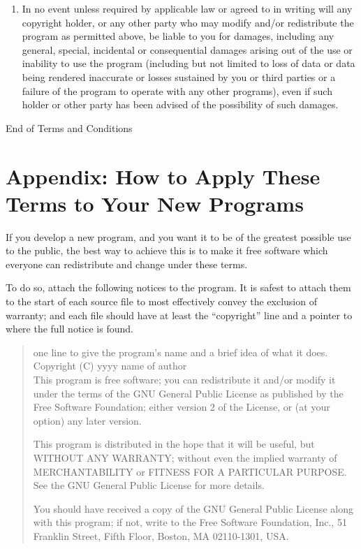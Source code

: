 \documentclass[12pt,a4paper]{article}
\begin{document}
\begin{enumerate}
\item
{\sc In no event unless required by applicable law or agreed to in writing
will any copyright holder, or any other party who may modify and/or
redistribute the program as permitted above, be liable to you for damages,
including any general, special, incidental or consequential damages arising
out of the use or inability to use the program (including but not limited
to loss of data or data being rendered inaccurate or losses sustained by
you or third parties or a failure of the program to operate with any other
programs), even if such holder or other party has been advised of the
possibility of such damages.}

\end{enumerate}


\begin{center}
{\Large\sc End of Terms and Conditions}
\end{center}


\pagebreak[2]

\section*{Appendix: How to Apply These Terms to Your New Programs}

If you develop a new program, and you want it to be of the greatest
possible use to the public, the best way to achieve this is to make it
free software which everyone can redistribute and change under these
terms.

  To do so, attach the following notices to the program.  It is safest to
  attach them to the start of each source file to most effectively convey
  the exclusion of warranty; and each file should have at least the
  ``copyright'' line and a pointer to where the full notice is found.

\begin{quote}
one line to give the program's name and a brief idea of what it does. \\
Copyright (C) yyyy  name of author \\

This program is free software; you can redistribute it and/or modify
it under the terms of the GNU General Public License as published by
the Free Software Foundation; either version 2 of the License, or
(at your option) any later version.

This program is distributed in the hope that it will be useful,
but WITHOUT ANY WARRANTY; without even the implied warranty of
MERCHANTABILITY or FITNESS FOR A PARTICULAR PURPOSE.  See the
GNU General Public License for more details.

You should have received a copy of the GNU General Public License
along with this program; if not, write to the Free Software
Foundation, Inc., 51 Franklin Street, Fifth Floor, Boston, MA  02110-1301, USA.
\end{quote}
\end{document}

